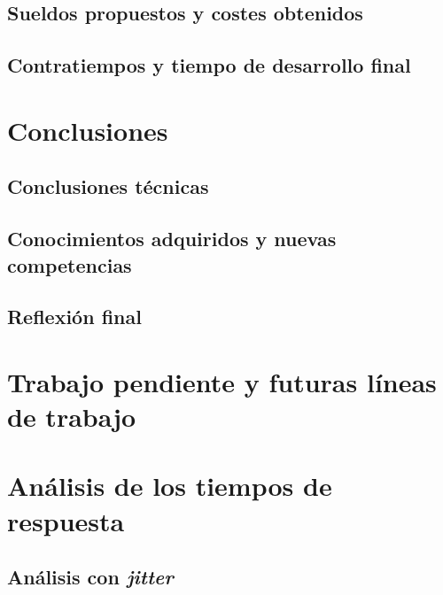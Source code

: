 \section{Sueldos propuestos y costes obtenidos}\label{sec:costs}

\section{Contratiempos y tiempo de desarrollo final}\label{sec:drawbacks}


\chapter{Conclusiones}\label{chap:conclussions}
\section{Conclusiones técnicas}

\section{Conocimientos adquiridos y nuevas competencias}

\section{Reflexión final}


\chapter{Trabajo pendiente y futuras líneas de trabajo}\label{chap:pending-work}


\printbibliography

\appendix
\chapter{Análisis de los tiempos de respuesta}\label{chap:rta}

\section{Análisis con \textit{jitter}}\label{sec:rta-jitter}

